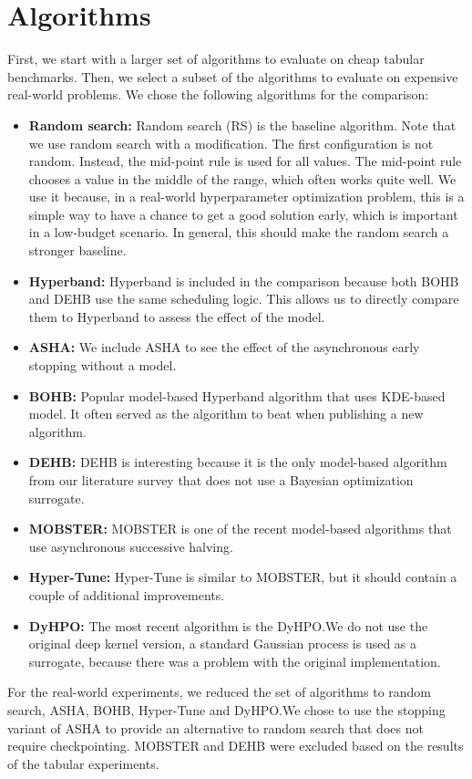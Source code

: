 \section{Algorithms}
First, we start with a larger set of algorithms to evaluate on cheap tabular benchmarks. Then, we select a subset of the algorithms to evaluate on expensive real-world problems. We chose the following algorithms for the comparison:
\begin{itemize}
\item \textbf{Random search:} Random search (RS) is the baseline algorithm. Note that we use random search with a modification. The first configuration is not random. Instead, the mid-point rule is used for all values. The mid-point rule chooses a value in the middle of the range, which often works quite well. We use it because, in a real-world hyperparameter optimization problem, this is a simple way to have a chance to get a good solution early, which is important in a low-budget scenario. In general, this should make the random search a stronger baseline.
\item \textbf{Hyperband:} Hyperband is included in the comparison because both BOHB and DEHB use the same scheduling logic. This allows us to directly compare them to Hyperband to assess the effect of the model.
\item \textbf{ASHA:} We include ASHA to see the effect of the asynchronous early stopping without a model.
\item \textbf{BOHB:} Popular model-based Hyperband algorithm that uses KDE-based model. It often served as the algorithm to beat when publishing a new algorithm.
\item \textbf{DEHB:} DEHB is interesting because it is the only model-based algorithm from our literature survey that does not use a Bayesian optimization surrogate.
\item \textbf{MOBSTER:} MOBSTER is one of the recent model-based algorithms that use asynchronous successive halving.
\item \textbf{Hyper-Tune:} Hyper-Tune is similar to MOBSTER, but it should contain a couple of additional improvements.
\item \textbf{DyHPO:} The most recent algorithm is the DyHPO.\@ We do not use the original deep kernel version, a standard Gaussian process is used as a surrogate, because there was a problem with the original implementation.
\end{itemize}

For the real-world experiments, we reduced the set of algorithms to random search, ASHA, BOHB, Hyper-Tune and DyHPO.\@ We chose to use the stopping variant of ASHA to provide an alternative to random search that does not require checkpointing. MOBSTER and DEHB were excluded based on the results of the tabular experiments.


